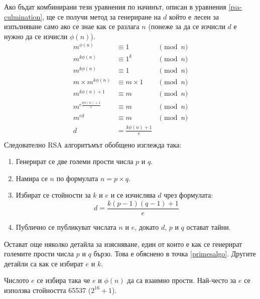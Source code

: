   Ако бъдат комбинирани тези уравнения по начинът, описан в уравнения \ref{rsa-culmination}, ще се получи метод за генериране на $d$ който е лесен за изпълняване само ако се знае как се разлага $n$ (понеже за да се изчисли $d$ е нужно да се изчисли $\phi(n)$).
  \begin{equation}
    \begin{alignedat}{2}
      m^{\phi(n)} &\equiv 1 &\pmod n \\
      m^{k\phi(n)} &\equiv 1^k &\pmod n \\
      m^{k\phi(n)} &\equiv 1 &\pmod n \\
      m\times m^{k\phi(n)} &\equiv m\times 1 &\pmod n \\
      m^{k\phi(n)+1} &\equiv m &\pmod n \\
      m^{e\frac{k\phi(n)+1}{e}} &\equiv m &\pmod n \\
      m^{ed} &\equiv m &\pmod n\\
      d &= \frac{k\phi(n)+1}{e} \\
    \end{alignedat}
    \label{rsa-culmination}
  \end{equation}
  Следователно RSA алгоритъмът обобщено изглежда така:
  \begin{enumerate}
    \item Генерират се две големи прости числа $p$ и $q$.
    \item Намира се $n$ по формулата $n = p \times q$.
    \item Избират се стойности за $k$ и $e$ и се изчислява $d$ чрез формулата: $$d = \frac{k(p-1)(q-1)+1}{e}$$
    \item Публично се публикуват числата $n$ и $e$, докато $d$, $p$ и $q$ остават тайни.
  \end{enumerate}

  Остават още няколко детайла за изясняване, един от които е как се генерират големите прости числа $p$ и $q$ бързо. Това е обяснено в точка \ref{primesalgo}. Другите детайли са как се избират $e$ и $k$.

  Числото $e$ се избира така че $e$ и $\phi(n)$ да са взаимно прости. %
  Най-често за $e$ се използва стойността 65537 ($2^{16}+1$). %

